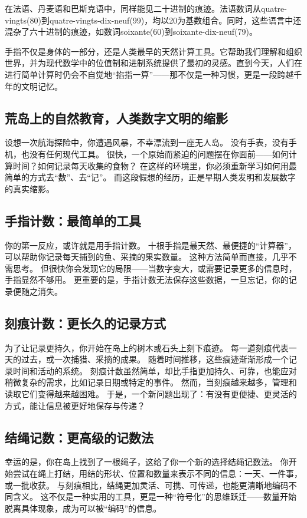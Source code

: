 在法语、丹麦语和巴斯克语中，同样能见二十进制的痕迹。法语数词从quatre-vingts(80)​到quatre-vingts-dix-neuf(99)，均以20为基数组合。同时，这些语言中还混杂了六十进制的痕迹，如数词soixante(60)到soixante-dix-neuf(79)。

手指不仅是身体的一部分，还是人类最早的天然计算工具。它帮助我们理解和组织世界，并为现代数学中的位值制和进制系统提供了最初的灵感。直到今天，人们在进行简单计算时仍会不自觉地“掐指一算”——那不仅是一种习惯，更是一段跨越千年的文明记忆。

\subsection{荒岛上的自然教育，人类数字文明的缩影}

设想一次航海探险中，你遭遇风暴，不幸漂流到一座无人岛。  
没有手表，没有手机，也没有任何现代工具。  
很快，一个原始而紧迫的问题摆在你面前——如何计算时间？如何记录每天收集的食物？  
在这样的环境里，你必须重新学习如何用最简单的方式去“数”、去“记”。  
而这段假想的经历，正是早期人类发明和发展数字的真实缩影。

\subsection*{手指计数：最简单的工具}
你的第一反应，或许就是用手指计数。  
十根手指是最天然、最便捷的“计算器”，可以帮助你记录每天捕到的鱼、采摘的果实数量。  
这种方法简单而直接，几乎不需思考。  
但很快你会发现它的局限——当数字变大，或需要记录更多的信息时，手指显然不够用。  
更重要的是，手指计数无法保存这些数据，一旦忘记，你的记录便随之消失。

\subsection*{刻痕计数：更长久的记录方式}

为了让记录更持久，你开始在岛上的树木或石头上刻下痕迹。  
每一道刻痕代表一天的过去，或一次捕猎、采摘的成果。  
随着时间推移，这些痕迹渐渐形成一个记录时间和活动的系统。  
刻痕计数虽然简单，却比手指更加持久、可靠，也能应对稍微复杂的需求，比如记录日期或特定的事件。  
然而，当刻痕越来越多，管理和读取它们变得越来越困难。  
于是，一个新问题出现了：有没有更便捷、更灵活的方式，能让信息被更好地保存与传递？  


\subsection*{结绳记数：更高级的记数法}
幸运的是，你在岛上找到了一根绳子，这给了你一个新的选择结绳记数法。  
你开始尝试在绳上打结，用结的形状、位置和数量来表示不同的信息：一天、一件事，或一批收获。  
与刻痕相比，结绳更加灵活、可携、可传递，也能更清晰地编码不同含义。  
这不仅是一种实用的工具，更是一种“符号化”的思维跃迁——数量开始脱离具体现象，成为可以被“编码”的信息。  


